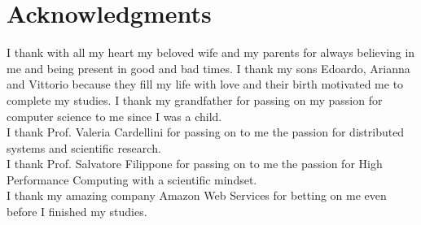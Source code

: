 


\chapter*{Acknowledgments}

I thank with all my heart my beloved wife and my parents for always believing in me and being present in good and bad times.
I thank my sons Edoardo, Arianna and Vittorio because they fill my life with love and their birth motivated me to complete my studies.
I thank my grandfather for passing on my passion for computer science to me since I was a child.\\
I thank Prof. Valeria Cardellini for passing on to me the passion for distributed systems and scientific research.\\
I thank Prof. Salvatore Filippone for passing on to me the passion for High Performance Computing with a scientific mindset.\\
I thank my amazing company Amazon Web Services for betting on me even before I finished my studies.
